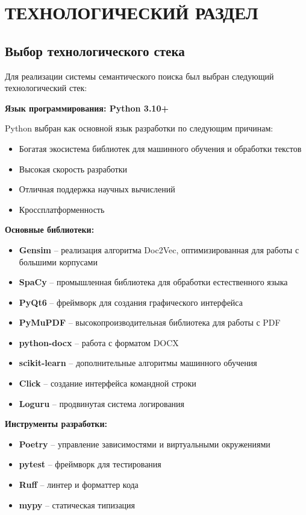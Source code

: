 \chapter{ТЕХНОЛОГИЧЕСКИЙ РАЗДЕЛ}

\section{Выбор технологического стека}

\justifying

Для реализации системы семантического поиска был выбран следующий технологический стек:

\textbf{Язык программирования: Python 3.10+}

Python выбран как основной язык разработки по следующим причинам:
\begin{itemize}
	\item Богатая экосистема библиотек для машинного обучения и обработки текстов
	\item Высокая скорость разработки
	\item Отличная поддержка научных вычислений
	\item Кроссплатформенность
\end{itemize}

\textbf{Основные библиотеки:}

\begin{itemize}
	\item \textbf{Gensim} – реализация алгоритма Doc2Vec, оптимизированная для работы с большими корпусами
	\item \textbf{SpaCy} – промышленная библиотека для обработки естественного языка
	\item \textbf{PyQt6} – фреймворк для создания графического интерфейса
	\item \textbf{PyMuPDF} – высокопроизводительная библиотека для работы с PDF
	\item \textbf{python-docx} – работа с форматом DOCX
	\item \textbf{scikit-learn} – дополнительные алгоритмы машинного обучения
	\item \textbf{Click} – создание интерфейса командной строки
	\item \textbf{Loguru} – продвинутая система логирования
\end{itemize}

\textbf{Инструменты разработки:}

\begin{itemize}
	\item \textbf{Poetry} – управление зависимостями и виртуальными окружениями
	\item \textbf{pytest} – фреймворк для тестирования
	\item \textbf{Ruff} – линтер и форматтер кода
	\item \textbf{mypy} – статическая типизация
\end{itemize}

